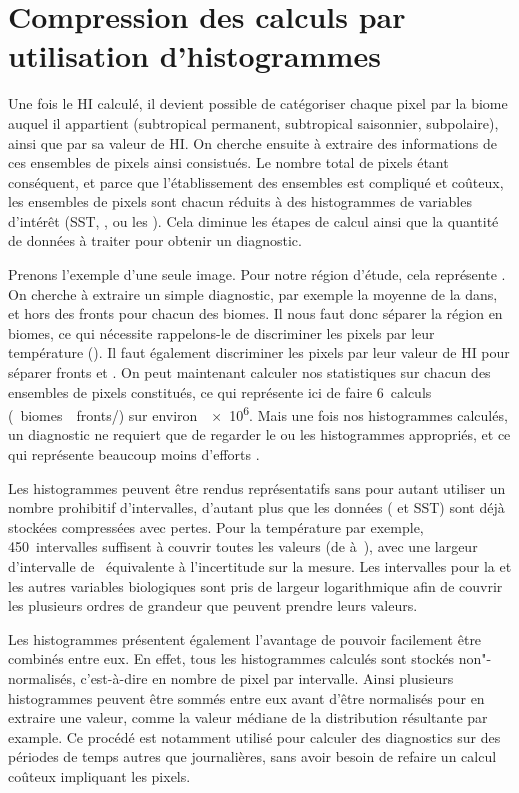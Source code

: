 \section{Compression des calculs par utilisation d'histogrammes}
\label{sec:extraction-hist}

Une fois le HI calculé, il devient possible de catégoriser chaque pixel par la biome auquel il appartient (subtropical permanent, subtropical saisonnier, subpolaire), ainsi que par sa valeur de HI.
On cherche ensuite à extraire des informations de ces ensembles de pixels ainsi consistués.
Le nombre total de pixels étant conséquent, et parce que l'établissement des ensembles est compliqué et coûteux, les ensembles de pixels sont chacun réduits à des histogrammes de variables d'intérêt (SST, , ou les ).
Cela diminue les étapes de calcul ainsi que la quantité de données à traiter pour obtenir un diagnostic.

Prenons l'exemple d'une seule image. Pour notre région d'étude, cela représente .
On cherche à extraire un simple diagnostic, par exemple la moyenne de la  dans, et hors des fronts pour chacun des biomes.
Il nous faut donc séparer la région en biomes, ce qui nécessite rappelons-le de discriminer les pixels par leur température ().
Il faut également discriminer les pixels par leur valeur de HI pour séparer fronts et .
On peut maintenant calculer nos statistiques sur chacun des ensembles de pixels constitués, ce qui représente ici de faire 6~calculs (~biomes~\texttimes\ fronts/) sur environ~\qty{e6}{\pixels}.
Mais une fois nos histogrammes calculés, un diagnostic ne requiert que de regarder le ou les histogrammes appropriés, et ce qui représente beaucoup moins d'efforts .

Les histogrammes peuvent être rendus représentatifs sans pour autant utiliser un nombre prohibitif d'intervalles, d'autant plus que les données ( et SST) sont déjà stockées compressées avec pertes. Pour la température par exemple, 450~intervalles suffisent à couvrir toutes les valeurs (de  à~), avec une largeur d'intervalle de~ équivalente à l'incertitude sur la mesure.
Les intervalles pour la  et les autres variables biologiques sont pris de largeur logarithmique afin de couvrir les plusieurs ordres de grandeur que peuvent prendre leurs valeurs.

Les histogrammes présentent également l'avantage de pouvoir facilement être combinés entre eux.
En effet, tous les histogrammes calculés sont stockés non"-normalisés, c'est-à-dire en nombre de pixel par intervalle. Ainsi plusieurs histogrammes peuvent être sommés entre eux avant d'être normalisés pour en extraire une valeur, comme la valeur médiane de la distribution résultante par example.
Ce procédé est notamment utilisé pour calculer des diagnostics sur des périodes de temps autres que journalières, sans avoir besoin de refaire un calcul coûteux impliquant les pixels.

